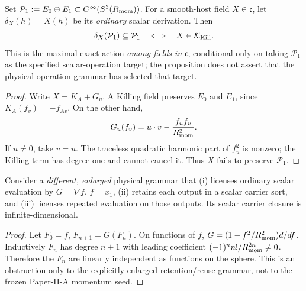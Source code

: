 \documentclass[12pt,a4paper]{article}
\begin{document}
\begin{proposition}
\label{p2b:prop:maximal-finite-scalar-action}
Set \(\mathcal P_1:=E_0\oplus E_1\subset C^\infty(S^3(R_{\mathrm{mom}}))\).
For a smooth-host field \(X\in\mathfrak c\), let
\(\delta_X(h)=X(h)\) be its \emph{ordinary} scalar derivation.  Then
\[
 \delta_X(\mathcal P_1)\subseteq\mathcal P_1
 \quad\Longleftrightarrow\quad X\in\mathcal K_{\rm Kill}.
\]
This is the maximal exact action \emph{among fields in}
\(\mathfrak c\), conditional only on taking \(\mathcal P_1\) as the
specified scalar-operation target; the proposition does not assert that
the physical operation grammar has selected that target.
\end{proposition}
\begin{proof}
Write \(X=K_A+G_u\).  A Killing field preserves \(E_0\) and
\(E_1\), since \(K_A(f_v)=-f_{Av}\).
On the other hand,
\[
 G_u(f_v)=u\cdot v-\frac{f_uf_v}{R_{\mathrm{mom}}^2}.
\]
If \(u\ne0\), take \(v=u\).  The traceless quadratic harmonic part of
\(f_u^2\) is nonzero; the Killing term has degree one and cannot
cancel it.  Thus \(X\) fails to preserve \(\mathcal P_1\).
\end{proof}

\begin{proposition}
\label{p2b:prop:gradient-evaluation-no-go}
Consider a \emph{different, enlarged} physical grammar that (i) licenses
ordinary scalar evaluation by \(G=\nabla f\), \(f=x_1\),
(ii) retains each output in a scalar carrier sort, and (iii) licenses
repeated evaluation on those outputs.  Its scalar carrier closure is
infinite-dimensional.
\end{proposition}
\begin{proof}
Let \(F_0=f\), \(F_{n+1}=G(F_n)\).  On functions of \(f\),
\(G=(1-f^2/R_{\mathrm{mom}}^2)d/df\).  Inductively \(F_n\) has degree
\(n+1\) with leading coefficient
\((-1)^n n!/R_{\mathrm{mom}}^{2n}\ne0\).  Therefore the
\(F_n\) are linearly independent as functions on the sphere.  This
is an obstruction only to the explicitly enlarged retention/reuse grammar,
not to the frozen Paper-II-A momentum seed.
\end{proof}
\end{document}

